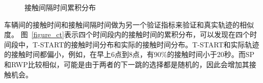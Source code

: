\begin{figure}[!h]
\centering
{}
\caption{接触间隔时间累积分布}\label{figure_ict}
\end{figure}

车辆间的接触时间和接触间隔时间做为另一个验证指标来验证和真实轨迹的相似度。
图~\ref{figure_ct}表示四个时间段内的接触时间的累积分布，可以发现在四个时间段中，T-START的接触时间分布和实际的接触时间分布。T-START和实际轨迹的接触时间都偏小，例如，在早上6点到8点，有$90\%$的接触时间小于20秒。而SP和RWP比较相似，可能是由于两者的下一跳的选择都是随机的，因此会增加其接触机会。

